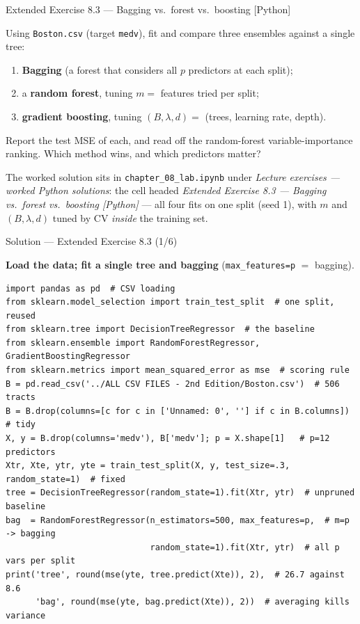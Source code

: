 \documentclass[aspectratio=169,11pt]{beamer}
\begin{document}
\begin{frame}{Extended Exercise 8.3 --- Bagging vs.\ forest vs.\ boosting [Python]}
\begin{longexercise}
Using \texttt{Boston.csv} (target \texttt{medv}), fit and compare three ensembles against a single tree:
\begin{enumerate}
  \item \textbf{Bagging} (a forest that considers all $p$ predictors at each split);
  \item a \textbf{random forest}, tuning $m=$ features tried per split;
  \item \textbf{gradient boosting}, tuning $(B,\lambda,d)=$ (trees, learning rate, depth).
\end{enumerate}
Report the test MSE of each, and read off the random-forest variable-importance ranking. Which method wins, and which predictors matter?
\end{longexercise}
\begin{labnote}
The worked solution sits in \texttt{chapter\_08\_lab.ipynb} under \emph{Lecture exercises --- worked Python solutions}: the cell headed \emph{Extended Exercise 8.3 --- Bagging vs.\ forest vs.\ boosting [Python]} --- all four fits on one split (seed 1), with $m$ and $(B,\lambda,d)$ tuned by CV \emph{inside} the training set.
\end{labnote}
\end{frame}

\begin{frame}[fragile]{Solution --- Extended Exercise 8.3 (1/6)}
\begin{solutionbox}
\textbf{Load the data; fit a single tree and bagging} (\texttt{max\_features=p} $=$ bagging).
\begin{lstlisting}[basicstyle=\ttfamily\scriptsize]
import pandas as pd  # CSV loading
from sklearn.model_selection import train_test_split  # one split, reused
from sklearn.tree import DecisionTreeRegressor  # the baseline
from sklearn.ensemble import RandomForestRegressor, GradientBoostingRegressor
from sklearn.metrics import mean_squared_error as mse  # scoring rule
B = pd.read_csv('../ALL CSV FILES - 2nd Edition/Boston.csv')  # 506 tracts
B = B.drop(columns=[c for c in ['Unnamed: 0', ''] if c in B.columns])  # tidy
X, y = B.drop(columns='medv'), B['medv']; p = X.shape[1]   # p=12 predictors
Xtr, Xte, ytr, yte = train_test_split(X, y, test_size=.3, random_state=1)  # fixed
tree = DecisionTreeRegressor(random_state=1).fit(Xtr, ytr)  # unpruned baseline
bag  = RandomForestRegressor(n_estimators=500, max_features=p,  # m=p -> bagging
                             random_state=1).fit(Xtr, ytr)  # all p vars per split
print('tree', round(mse(yte, tree.predict(Xte)), 2),  # 26.7 against 8.6
      'bag', round(mse(yte, bag.predict(Xte)), 2))  # averaging kills variance
\end{lstlisting}
\end{solutionbox}
\end{frame}
\end{document}
